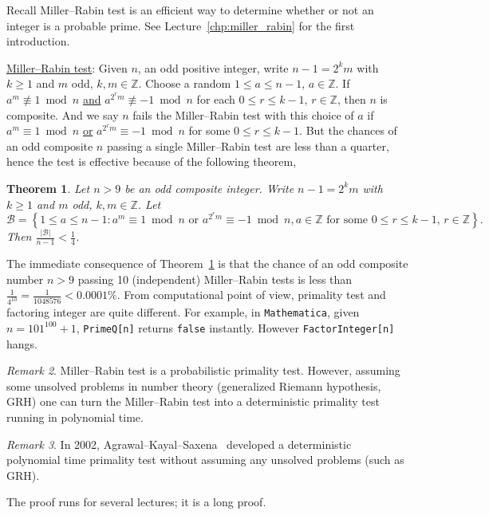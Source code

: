 \documentclass{amsbook}
\theoremstyle{plain}
\newtheorem{theorem}{Theorem}[chapter] %
\theoremstyle{definition}
\theoremstyle{remark}
\newtheorem{remark}[theorem]{Remark}
\numberwithin{equation}{chapter}
\numberwithin{figure}{chapter}
\newcommand{\Z}{\mathbb{Z}}
\newcommand{\sB}{\mathcal{B}}
\begin{document}
Recall Miller--Rabin test is an efficient way to determine whether or not an integer is a probable prime. See Lecture~\ref{chp:miller_rabin} for the first introduction.

\underline{Miller--Rabin test}: Given $n$, an odd positive integer, write $n - 1 = 2^km$ with $k \geqslant 1$ and $m$ odd, $k, m \in \Z$. Choose a random $1 \leqslant a \leqslant n - 1$, $a \in \Z$. If $a^m \not\equiv 1 \bmod n$ \underline{and} $a^{2^r m} \not\equiv -1 \bmod n$ for each $0 \leqslant r \leqslant k - 1$, $r \in \Z$, then $n$ is composite. And we say $n$ fails the Miller--Rabin test with this choice of $a$ if $a^m \equiv 1 \bmod n$ \underline{or} $a^{2^r m} \equiv -1 \bmod n$ for some $0 \leqslant r \leqslant k - 1$. But the chances of an odd composite $n$ passing a single Miller--Rabin test are less than a quarter, hence the test is effective because of the following theorem, 
\begin{theorem}\label{thm:miller_rabin}
  Let $n > 9$ be an odd composite integer. Write $n - 1 = 2^k m$ with $k \geqslant 1$ and $m$ odd, $k, m \in \Z$. Let
  \[
  \sB = \left\{ 1 \leqslant a \leqslant n - 1: a^m \equiv 1 \bmod n \text{ or } a^{2^r m } \equiv -1 \bmod n, a \in \Z \text{ for some $0 \leqslant r \leqslant k - 1$, $r \in \Z$} \right\}.
  \]
  Then $\frac{\vert \sB \vert}{n - 1} < \frac{1}4$.
\end{theorem}
The immediate consequence of Theorem~\ref{thm:miller_rabin} is that the chance of an odd composite number $n > 9$ passing 10 (independent) Miller--Rabin tests is less than $\frac{1}{4^{10}} = \frac{1}{1048576} < 0.0001\%$. From computational point of view, primality test and factoring integer are quite different. For example, in \verb|Mathematica|, given $n = 101^{100} + 1$, \verb|PrimeQ[n]| returns \verb|false| instantly. However \verb|FactorInteger[n]| hangs.

\begin{remark}
  Miller--Rabin test is a probabilistic primality test. However, assuming some unsolved problems in number theory (generalized Riemann hypothesis, GRH) one can turn the Miller--Rabin test into a deterministic primality test running in polynomial time.
\end{remark}
\begin{remark}
  In 2002, Agrawal--Kayal--Saxena~\cite{Agrawal2004} developed a deterministic polynomial time primality test without assuming any unsolved problems (such as GRH).
\end{remark}

The proof runs for several lectures; it is a long proof.
\end{document}
